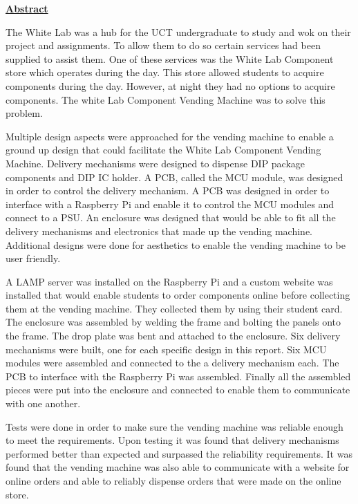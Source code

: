 \documentclass[a4paper,11pt]{article}
\numberwithin{figure}{section}
\numberwithin{table}{section}
\begin{document}
	{\centering\Huge\bfseries\underline{Abstract}\par}

The White Lab was a hub for the UCT undergraduate to study and wok on their project and assignments. To allow them to do so certain services had been supplied to assist them. One of these services was the White Lab Component store which operates during the day. This store allowed students to acquire components during the day. However, at night they had no options to acquire components. The white Lab Component Vending Machine was to solve this problem.

Multiple design aspects were approached for the vending machine to enable a ground up design that could facilitate the White Lab Component Vending Machine. Delivery mechanisms were designed to dispense DIP package components and DIP IC holder. A PCB, called the MCU module, was designed in order to control the delivery mechanism. A PCB was designed in order to interface with a Raspberry Pi and enable it to control the MCU modules and connect to a PSU. An enclosure was designed that would be able to fit all the delivery mechanisms and electronics that made up the vending machine. Additional designs were done for aesthetics to enable the vending machine to be user friendly.

A LAMP server was installed on the Raspberry Pi and a custom website was installed that would enable students to order components online before collecting them at the vending machine. They collected them by using their student card. The enclosure was assembled by welding the frame and bolting the panels onto the frame. The drop plate was bent and attached to the enclosure. Six delivery mechanisms were built, one for each specific design in this report. Six MCU modules were assembled and connected to the a delivery mechanism each. The PCB to interface with the Raspberry Pi was assembled. Finally all the assembled pieces were put into the enclosure and connected to enable them to communicate with one another.

Tests were done in order to make sure the vending machine was reliable enough to meet the requirements. Upon testing it was found that delivery mechanisms performed better than expected and surpassed the reliability requirements. It was found that the vending machine was also able to communicate with a website for online orders and able to reliably dispense orders that were made on the online store.
\end{document}
